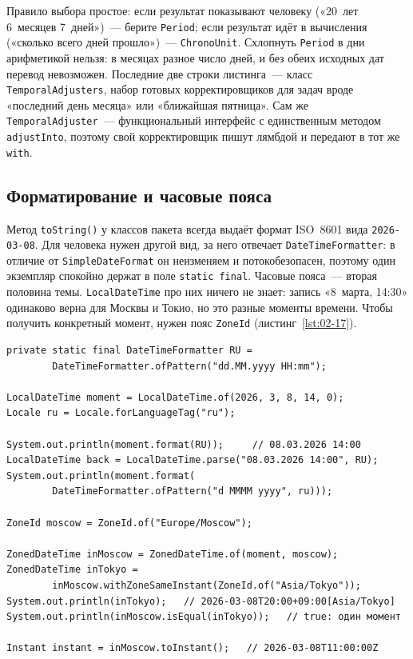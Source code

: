 Правило выбора простое: если результат показывают человеку («20~лет 6~месяцев
7~дней»)~--- берите \texttt{Period}; если результат идёт в вычисления
(«сколько всего дней прошло»)~--- \texttt{ChronoUnit}. Схлопнуть
\texttt{Period} в дни арифметикой нельзя: в месяцах разное число дней, и без
обеих исходных дат перевод невозможен. Последние две строки листинга~---
класс \texttt{TemporalAdjusters}, набор готовых корректировщиков для задач
вроде «последний день месяца» или «ближайшая пятница». Сам же
\texttt{TemporalAdjuster}~--- функциональный интерфейс с единственным методом
\texttt{adjustInto}, поэтому свой корректировщик пишут лямбдой и передают в
тот же \texttt{with}.

\subsection{Форматирование и часовые пояса}

Метод \texttt{toString()} у классов пакета всегда выдаёт формат ISO~8601 вида
\texttt{2026-03-08}. Для человека нужен другой вид, за него отвечает
\texttt{DateTimeFormatter}: в отличие от \texttt{SimpleDateFormat} он
неизменяем и потокобезопасен, поэтому один экземпляр спокойно держат в поле
\texttt{static final}. Часовые пояса~--- вторая половина темы.
\texttt{LocalDateTime} про них ничего не знает: запись «8~марта, 14:30»
одинаково верна для Москвы и Токио, но это разные моменты времени. Чтобы
получить конкретный момент, нужен пояс \texttt{ZoneId}
(листинг~\ref{lst:02-17}).

\begin{listing}[H]
\begin{verbatim}
private static final DateTimeFormatter RU =
        DateTimeFormatter.ofPattern("dd.MM.yyyy HH:mm");

LocalDateTime moment = LocalDateTime.of(2026, 3, 8, 14, 0);
Locale ru = Locale.forLanguageTag("ru");

System.out.println(moment.format(RU));     // 08.03.2026 14:00
LocalDateTime back = LocalDateTime.parse("08.03.2026 14:00", RU);
System.out.println(moment.format(
        DateTimeFormatter.ofPattern("d MMMM yyyy", ru)));

ZoneId moscow = ZoneId.of("Europe/Moscow");

ZonedDateTime inMoscow = ZonedDateTime.of(moment, moscow);
ZonedDateTime inTokyo =
        inMoscow.withZoneSameInstant(ZoneId.of("Asia/Tokyo"));
System.out.println(inTokyo);   // 2026-03-08T20:00+09:00[Asia/Tokyo]
System.out.println(inMoscow.isEqual(inTokyo));   // true: один момент

Instant instant = inMoscow.toInstant();   // 2026-03-08T11:00:00Z
\end{verbatim}
\caption{Форматирование дат и работа с часовыми поясами}
\label{lst:02-17}
\end{listing}

